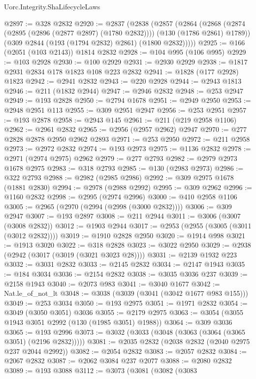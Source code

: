 \begin{lexlean}{Uorc.Integrity.ShaLifecycleLaws}
\begin{coremodule}
@2897 := @328 @2832
@2920 := @2837
    (@2838
      (@2857
        (@2864
          (@2868 (@2874 (@2895 (@2896 (@2877 @2897) (@1780 @2832)))) (@130 (@1786 @2861) @1789))
          (@309 @2844 (@193 (@1794 @2832) @2861) (@1800 @2832)))))
@2925 := @166 (@2051 (@103 @2143)) @1814 @2832
@2928 := @104 @995 (@106 @995)
@2929 := @103 @2928
@2930 := @100 @2929
@2931 := @2930 @2929
@2938 := @1817 @2931 @2834 @178 @1823 @108 @223 @2832
@2941 := @1828 (@177 @2928) @1823
@2942 := @2941 @2832
@2943 := @220 @2928
@2944 := @2943 @1813
@2946 := @211 (@1832 @2944)
@2947 := @2946 @2832
@2948 := @253 @2947
@2949 := @193 @2828
@2950 := @2794 @1678
@2951 := @2949 @2950
@2953 := @2948 @2951 @113
@2955 := @309 @2951 @2947
@2956 := @253 @2951
@2957 := @193 @2878
@2958 := @2943 @145
@2961 := @211 (@219 @2958 @1106)
@2962 := @2961 @2832
@2965 := @2956 (@2957 @2962) @2947
@2970 := @277 @2828 @2878 @2950 @2962 @2893
@2971 := @253 @2950
@2972 := @211 @2958
@2973 := @2972 @2832
@2974 := @193 @2973
@2975 := @1136 @2832
@2978 := @2971 (@2974 @2975) @2962
@2979 := @277 @2793
@2982 := @2979 @2973 @1678 @2975
@2983 := @318 @2793
@2985 := @130 (@2983 @2973)
@2986 := @322 @2793
@2988 := @2982 (@2985 @2986)
@2992 := @309 @2975 @1678 (@1881 @2830)
@2994 := @2978 (@2988 @2992)
@2995 := @309 @2962
@2996 := @1160 @2832
@2998 := @2995 (@2974 @2996)
@3000 := @410 @2958 @1106
@3005 := @2965 (@2970 (@2994 (@2998 (@3000 @2832))))
@3006 := @309 @2947
@3007 := @193 @2897
@3008 := @211 @2944
@3011 := @3006 (@3007 (@3008 @2832))
@3012 := @1903 @2944
@3017 := @2953 (@2955 (@3005 (@3011 (@3012 @2832))))
@3019 := @1910 @2828 @2950
@3020 := @1914 @998
@3021 := @1913 @3020
@3022 := @318 @2828
@3023 := @3022 @2950
@3029 := @2938 (@2942 (@3017 (@3019 (@3021 @3023 @28))))
@3031 := @2139 @1932 @223
@3032 := @3031 @2832
@3033 := @2145 @2832
@3034 := @2147 @1943
@3035 := @184 @3034
@3036 := @2154 @2832
@3038 := @3035 @3036 @237
@3039 := @2158 @1943
@3040 := @2073 @983
@3041 := @3040 @1677
@3042 := Nat.le_of_not_lt
@3048 := @3038 (@3039 (@3041 (@3042 @1677 @983 @155)))
@3049 := @253 @3034
@3050 := @193 @2975
@3051 := @1971 @2832
@3054 := @3049 (@3050 @3051) @3036
@3055 := @2179 @2975
@3063 := @3054 (@3055 @1943 @3051 @2992 (@130 (@1985 @3051) @1988))
@3064 := @309 @3036
@3065 := @193 @2996
@3073 := @3032 (@3033 (@3048 (@3063 (@3064 (@3065 @3051) (@2196 @2832)))))
@3081 := @2035 @2832 (@2038 @2832 (@2040 @2975 @237 @2044 @2992))
@3082 := @2054 @2832
@3083 := @2057 @2832
@3084 := @2067 @2832
@3087 := @2062 @3084 @237 @2077
@3088 := @2080 @2832
@3089 := @193 @3088
@3112 := @3073
    (@3081
      (@3082
        (@3083

\end{coremodule}
\end{lexlean}
